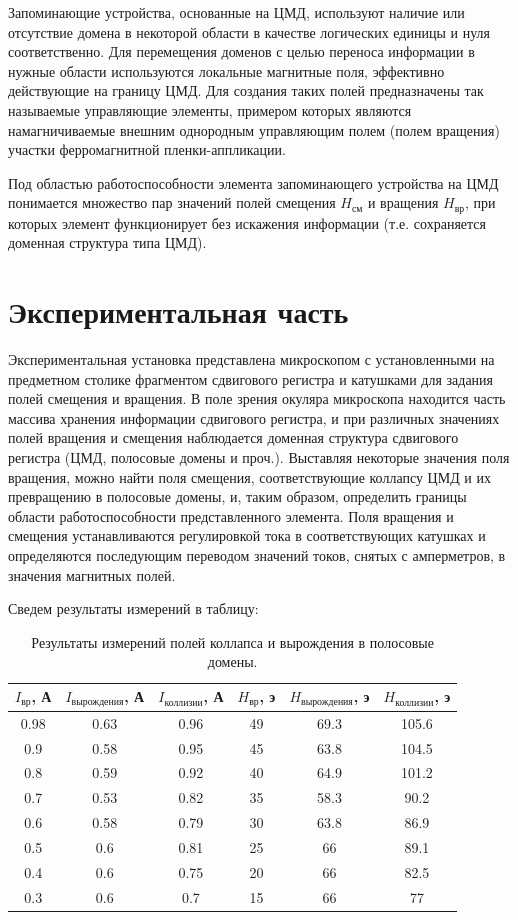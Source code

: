 \documentclass[a4paper, 12pt]{article}
\begin{document}
	Запоминающие устройства, основанные на ЦМД, используют наличие или отсутствие домена в некоторой области в качестве логических единицы и нуля соответственно. Для перемещения доменов с целью переноса информации в нужные области используются локальные магнитные поля, эффективно действующие на границу ЦМД. Для создания таких полей предназначены так называемые управляющие элементы, примером которых являются намагничиваемые внешним однородным управляющим полем (полем вращения) участки ферромагнитной пленки-аппликации.

	Под областью работоспособности элемента запоминающего устройства на ЦМД понимается множество пар значений полей смещения $H_{\text{см}}$ и вращения $H_{\text{вр}}$, при которых элемент функционирует без искажения информации (т.е. сохраняется доменная структура типа ЦМД).

	\section{Экспериментальная часть}
	Экспериментальная установка представлена микроскопом с установленными на предметном столике фрагментом сдвигового регистра и катушками для задания полей смещения и вращения. В поле зрения окуляра микроскопа находится часть массива хранения информации сдвигового регистра, и при различных значениях полей вращения и смещения наблюдается доменная структура сдвигового регистра (ЦМД, полосовые домены и проч.). Выставляя некоторые значения поля вращения, можно найти поля смещения, соответствующие коллапсу ЦМД и их превращению в полосовые домены, и, таким образом, определить границы области работоспособности представленного элемента. Поля вращения и смещения устанавливаются регулировкой тока в соответствующих катушках и определяются последующим переводом значений токов, снятых с амперметров, в значения магнитных полей.

	Сведем результаты измерений в таблицу:
	\newpage
	\begin{table}[!htb]
		\centering
		\caption{Результаты измерений полей коллапса и вырождения в полосовые домены.}
		\begin{tabular}{|c|c|c||c|c|c|}
			\hline
			$I_{\text{вр}}$, А & $I_{\text{вырождения}}$, А & $I_{\text{коллизии}}$, А & $H_{\text{вр}}$, э & $H_{\text{вырождения}}$, э & $H_{\text{коллизии}}$, э\\
			\hline
			0.98 & 0.63 & 0.96 & 49 & 69.3 & 105.6\\
			0.9 & 0.58 & 0.95 & 45 & 63.8 & 104.5\\
			0.8 & 0.59 & 0.92 & 40 & 64.9 & 101.2\\
			0.7 & 0.53 & 0.82 & 35 & 58.3 & 90.2\\
			0.6 & 0.58 & 0.79 & 30 & 63.8 & 86.9\\
			0.5 & 0.6 & 0.81 & 25 & 66 & 89.1\\
			0.4 & 0.6 & 0.75 & 20 & 66 & 82.5\\
			0.3 & 0.6 & 0.7	& 15 & 66 & 77\\
			\hline
		\end{tabular}
	\end{table}
\end{document}
